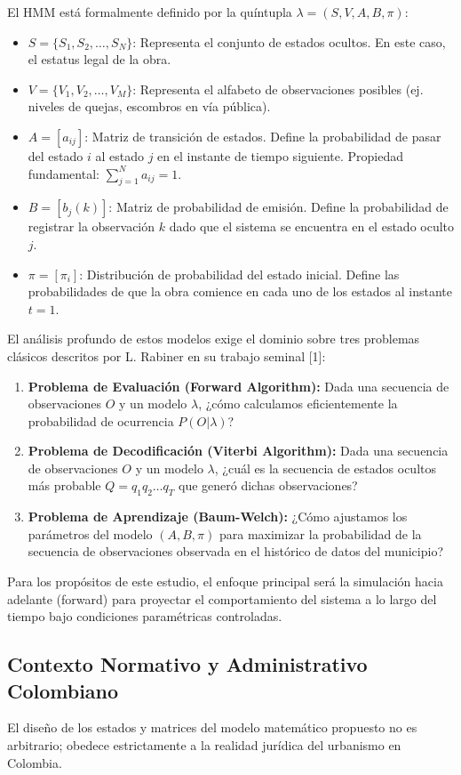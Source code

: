 \documentclass[12pt,letterpaper]{article}
\begin{document}
El HMM está formalmente definido por la quíntupla $\lambda = (S, V, A, B, \pi)$:
\begin{itemize}
    \item $S = \{S_1, S_2, \dots, S_N\}$: Representa el conjunto de estados ocultos. En este caso, el estatus legal de la obra.
    \item $V = \{V_1, V_2, \dots, V_M\}$: Representa el alfabeto de observaciones posibles (ej. niveles de quejas, escombros en vía pública).
    \item $A = [a_{ij}]$: Matriz de transición de estados. Define la probabilidad de pasar del estado $i$ al estado $j$ en el instante de tiempo siguiente. Propiedad fundamental: $\sum_{j=1}^{N} a_{ij} = 1$.
    \item $B = [b_{j}(k)]$: Matriz de probabilidad de emisión. Define la probabilidad de registrar la observación $k$ dado que el sistema se encuentra en el estado oculto $j$.
    \item $\pi = [\pi_i]$: Distribución de probabilidad del estado inicial. Define las probabilidades de que la obra comience en cada uno de los estados al instante $t=1$.
\end{itemize}

El análisis profundo de estos modelos exige el dominio sobre tres problemas clásicos descritos por L. Rabiner en su trabajo seminal [1]:
\begin{enumerate}
    \item \textbf{Problema de Evaluación (Forward Algorithm):} Dada una secuencia de observaciones $O$ y un modelo $\lambda$, ¿cómo calculamos eficientemente la probabilidad de ocurrencia $P(O|\lambda)$?
    \item \textbf{Problema de Decodificación (Viterbi Algorithm):} Dada una secuencia de observaciones $O$ y un modelo $\lambda$, ¿cuál es la secuencia de estados ocultos más probable $Q = q_1 q_2 \dots q_T$ que generó dichas observaciones?
    \item \textbf{Problema de Aprendizaje (Baum-Welch):} ¿Cómo ajustamos los parámetros del modelo $(A, B, \pi)$ para maximizar la probabilidad de la secuencia de observaciones observada en el histórico de datos del municipio?
\end{enumerate}

Para los propósitos de este estudio, el enfoque principal será la simulación hacia adelante (forward) para proyectar el comportamiento del sistema a lo largo del tiempo bajo condiciones paramétricas controladas.

\subsection{Contexto Normativo y Administrativo Colombiano}
El diseño de los estados y matrices del modelo matemático propuesto no es arbitrario; obedece estrictamente a la realidad jurídica del urbanismo en Colombia.
\end{document}
